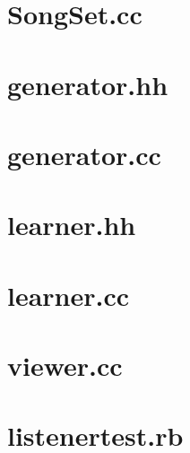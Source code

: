 \section{SongSet.cc}

\section{generator.hh}

\section{generator.cc}

\section{learner.hh}

\section{learner.cc}

\section{viewer.cc}

\section{listenertest.rb}

